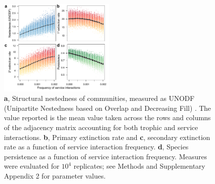 \documentclass[twocolumn,preprintnumbers,amsmath,amssymb,superscriptaddress,linenumbers]{revtex4-1}
\begin{document}
\begin{bibunit}


\begin{figure}[h!]
\centering
\includegraphics[width=0.5\textwidth]{fig_nested4.pdf}
\vspace{-6mm}
\caption{
\textbf{a}, Structural nestedness of communities, measured as UNODF (Unipartite Nestedness based on Overlap and Decreasing Fill) \cite{Cantor2017}.
The value reported is the mean value taken across the rows and columns of the adjacency matrix accounting for both trophic and service interactions.
\textbf{b}, Primary extinction rate and \textbf{c}, secondary extinction rate as a function of service interaction frequency.
\textbf{d}, Species persistence as a function of service interaction frequency.
Measures were evaluated for $10^4$ replicates; see Methods and Supplementary Appendix 2 for parameter values.
\vspace{-6mm}
}
\label{fig:nest}
\end{figure}



\end{bibunit}
\end{document}
